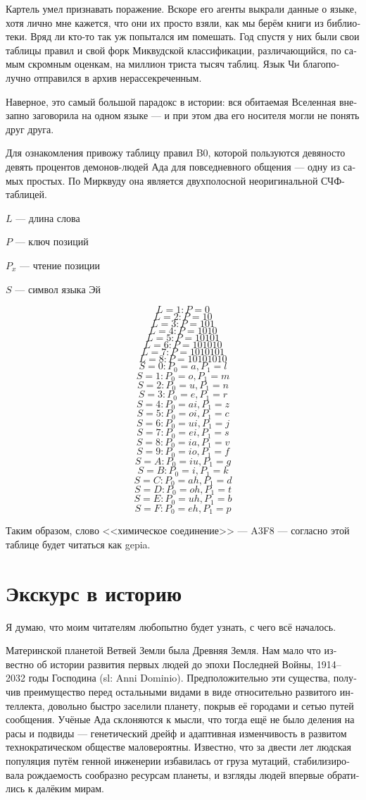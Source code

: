 \documentclass[a4paper,12pt,fleqn]{book}\usepackage{cooltooltips}\usepackage{polyglossia}\setdefaultlanguage[babelshorthands=true]{russian}\setotherlanguage{english}\defaultfontfeatures{Ligatures=TeX,Mapping=tex-text} \usepackage{xcolor}\definecolor{lightgray}{HTML}{bbbbbb}\color{lightgray}\newcommand{\ml}[3]{\textenglish{\textcolor{black}{#3}}}
\begin{document}
{Картель умел признавать поражение.
Вскоре его агенты выкрали данные о языке, хотя лично мне кажется, что они их просто взяли, как мы берём книги из библиотеки.
Вряд ли кто-то так уж попытался им помешать.
Год спустя у них были свои таблицы правил и свой форк Миквудской классификации, различающийся, по самым скромным оценкам, на миллион триста тысяч таблиц.
Язык Чи благополучно отправился в архив нерассекреченным.

Наверное, это самый большой парадокс в истории: вся обитаемая Вселенная внезапно заговорила на одном языке --- и при этом два его носителя могли не понять друг друга.

Для ознакомления привожу таблицу правил B0, которой пользуются девяносто девять процентов демонов-людей Ада для повседневного общения --- одну из самых простых.
По Мирквуду она является двухполосной неоригинальной СЧФ-таблицей.

$L$ --- длина слова

$P$ --- ключ позиций

$P_x$ --- чтение позиции

$S$ --- символ языка Эй

\[L = 1: P = 0\]
\[L = 2: P = 10\]
\[L = 3: P = 101\]
\[L = 4: P = 1010\]
\[L = 5: P = 10101\]
\[L = 6: P = 101010\]
\[L = 7: P = 1010101\]
\[L = 8: P = 10101010\]
\[S = 0: P_0 = a, P_1 = l\]
\[S = 1: P_0 = o, P_1 = m\]
\[S = 2: P_0 = u, P_1 = n\]
\[S = 3: P_0 = e, P_1 = r\]
\[S = 4: P_0 = ai, P_1 = z\]
\[S = 5: P_0 = oi, P_1 = c\]
\[S = 6: P_0 = ui, P_1 = j\]
\[S = 7: P_0 = ei, P_1 = s\]
\[S = 8: P_0 = ia, P_1 = v\]
\[S = 9: P_0 = io, P_1 = f\]
\[S = A: P_0 = iu, P_1 = g\]
\[S = B: P_0 = i, P_1 = k\]
\[S = C: P_0 = ah, P_1 = d\]
\[S = D: P_0 = oh, P_1 = t\]
\[S = E: P_0 = uh, P_1 = b\]
\[S = F: P_0 = eh, P_1 = p\]

Таким образом, слово <<химическое соединение>> --- A3F8 --- согласно этой таблице будет читаться как gepia.

\section{Экскурс в историю}

Я думаю, что моим читателям любопытно будет узнать, с чего всё началось.

Материнской планетой Ветвей Земли была Древняя Земля.
Нам мало что известно об истории развития первых людей до эпохи Последней Войны, 1914--2032 годы Господина (sl: Anni Dominio).
Предположительно эти существа, получив преимущество перед остальными видами в виде относительно развитого интеллекта, довольно быстро заселили планету, покрыв её городами и сетью путей сообщения.
Учёные Ада склоняются к мысли, что тогда ещё не было деления на расы и подвиды --- генетический дрейф и адаптивная изменчивость в развитом технократическом обществе маловероятны.
Известно, что за двести лет людская популяция путём генной инженерии избавилась от груза мутаций, стабилизировала рождаемость сообразно ресурсам планеты, и взгляды людей впервые обратились к далёким мирам.

}
\end{document}
